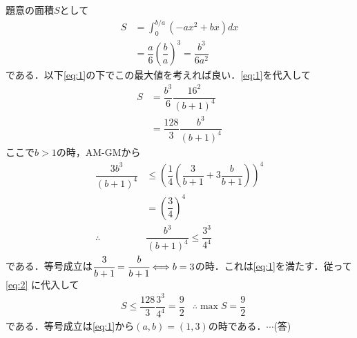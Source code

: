 \documentclass[../../main.tex]{subfiles}
\begin{document}
題意の面積$S$として
\begin{align}
  S&=\int_0^{b/a}(-ax^2+bx)dx \\
  &=\dfrac{a}{6}\left(\dfrac{b}{a}\right)^3=\dfrac{b^3}{6a^2}
\end{align}
である．以下\cref{eq:1}の下でこの最大値を考えれば良い．\cref{eq:1}を代入して
\begin{align}
  S&=\dfrac{b^3}{6}\dfrac{16^2}{(b+1)^4} \nonumber\\
  &=\dfrac{128}{3}\dfrac{b^3}{(b+1)^4}\label{eq:2}　
\end{align}
ここで$b>1$の時，AM-GMから
\begin{align}
  \dfrac{3b^3}{(b+1)^4}&\le\left(\dfrac{1}{4}\left(\dfrac{3}{b+1}+3\dfrac{b}{b+1}\right)\right)^4 \\
  &=\left(\dfrac{3}{4}\right)^4 \\
  \therefore &\dfrac{b^3}{(b+1)^4}\le \dfrac{3^3}{4^4}
\end{align}
である．等号成立は$\cfrac{3}{b+1}=\cfrac{b}{b+1}\Longleftrightarrow b=3$の時．これは\cref{eq:1}を満たす．従って\cref{eq:2}
に代入して
\begin{align}
  &S\le\dfrac{128}{3}\dfrac{3^3}{4^4}=\dfrac{9}{2}
  &\therefore \max S=\dfrac{9}{2}
\end{align}
である．等号成立は\cref{eq:1}から$(a,b)=(1,3)$の時である．$\cdots$(答)

\newpage
\end{document}

